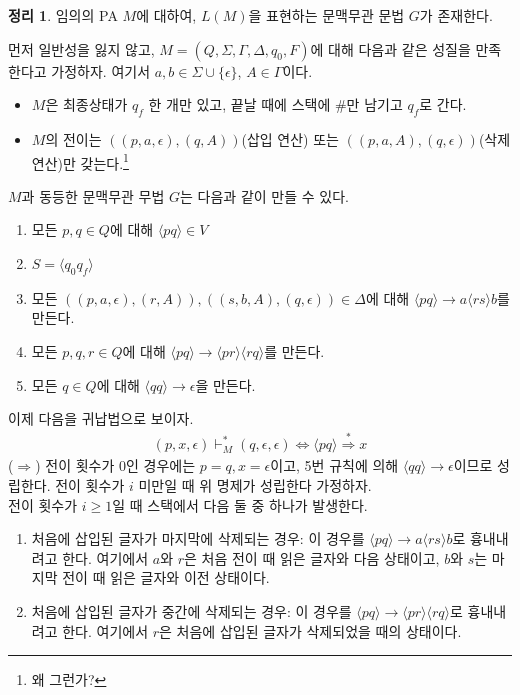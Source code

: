 \documentclass[b5paper, 11pt]{book}
\theoremstyle{definition}
\newtheorem{thm}[defn]{정리}
\newenvironment{pf*}{\pushQED{\qed}\pf}
{\popQED\endpf}
\begin{document}
\begin{thm}
임의의 PA $M$에 대하여, $L(M)$을 표현하는 문맥무관 문법 $G$가 존재한다. 
\end{thm}
\begin{pf*}
먼저 일반성을 잃지 않고, $M = (Q, \Sigma, \Gamma, \Delta, q_0, F)$에 대해 다음과 같은 성질을 만족한다고 가정하자. 여기서 $a, b\in \Sigma \cup \{\epsilon\}$, $A\in\Gamma$이다.
\begin{itemize}
    \item $M$은 최종상태가 $q_f$ 한 개만 있고, 끝날 때에 스택에 \#만 남기고 $q_f$로 간다. \item $M$의 전이는 $((p, a, \epsilon), (q, A))$(삽입 연산) 또는 $((p, a, A), (q, \epsilon))$(삭제 연산)만 갖는다.\footnote{왜 그런가?}
\end{itemize}
$M$과 동등한 문맥무관 무법 $G$는 다음과 같이 만들 수 있다.
\begin{enumerate}
    \item 모든 $p, q \in Q$에 대해 $\langle pq \rangle \in V$ \item $S = \langle q_0 q_f\rangle$  \item 모든 $((p,a,\epsilon),(r,A)), ((s,b,A),(q,\epsilon)) \in \Delta$에 대해 $\langle pq \rangle \rightarrow a \langle rs \rangle b$를 만든다. \item 모든 $p, q, r \in Q$에 대해 $\langle pq \rangle \rightarrow \langle pr \rangle \langle rq \rangle$를 만든다. \item 모든 $q \in Q$에 대해 $\langle qq \rangle \rightarrow \epsilon$을 만든다.
\end{enumerate}
이제 다음을 귀납법으로 보이자.
\begin{align*}
    (p, x, \epsilon) \vdash^*_M (q, \epsilon, \epsilon) \Leftrightarrow \langle pq \rangle \overset{*}{\Rightarrow} x
\end{align*}
($\Rightarrow$) 전이 횟수가 0인 경우에는 $p=q, x = \epsilon$이고, 5번 규칙에 의해 $\langle qq \rangle \rightarrow \epsilon$이므로 성립한다. 전이 횟수가 $i$ 미만일 때 위 명제가 성립한다 가정하자. \\
전이 횟수가 $i \ge 1$일 때 스택에서 다음 둘 중 하나가 발생한다.
\begin{enumerate}
    \item 처음에 삽입된 글자가 마지막에 삭제되는 경우: 이 경우를 $\langle pq \rangle \rightarrow a \langle rs \rangle b$로 흉내내려고 한다. 여기에서 $a$와 $r$은 처음 전이 때 읽은 글자와 다음 상태이고, $b$와 $s$는 마지막 전이 때 읽은 글자와 이전 상태이다.
    \item 처음에 삽입된 글자가 중간에 삭제되는 경우: 이 경우를 $\langle pq \rangle \rightarrow \langle pr \rangle \langle rq \rangle$로 흉내내려고 한다. 여기에서 $r$은 처음에 삽입된 글자가 삭제되었을 때의 상태이다.

\end{enumerate}
\end{pf*}
\end{document}
